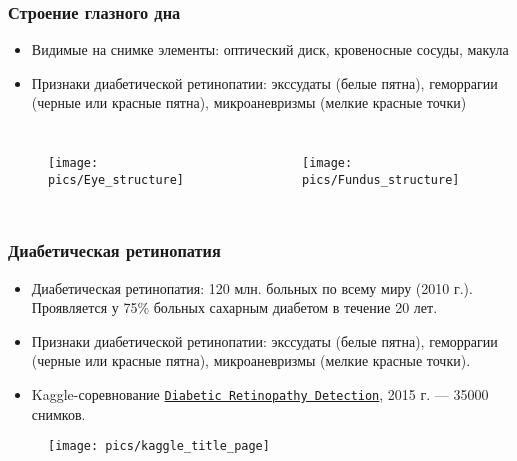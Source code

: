 \documentclass{beamer}
\begin{document}
\begin{frame}
	\frametitle{Строение глазного дна}
	
	\begin{itemize}
		\item Видимые на снимке элементы: оптический диск, кровеносные сосуды, макула
		\item Признаки диабетической ретинопатии: экссудаты (белые пятна), геморрагии (черные или красные пятна), микроаневризмы (мелкие красные точки)
	\end{itemize}
	
	\begin{columns}[c]
			\begin{figure}
				\centering
				\texttt{[image: pics/Eye\_structure]}
				\label{fig:Eye_structure}
			\end{figure}
		
			\begin{figure}
				\centering
				\texttt{[image: pics/Fundus\_structure]}
				\label{fig:Fundus_structure}
			\end{figure}
		
	\end{columns}
	
	
\end{frame}


\begin{frame}
	\frametitle{Диабетическая ретинопатия}
	
			\begin{itemize}
				\item Диабетическая ретинопатия: 120 млн. больных по всему миру (2010 г.). Проявляется у 75\% больных сахарным диабетом в течение 20 лет.
				\item Признаки диабетической ретинопатии: экссудаты (белые пятна), геморрагии (черные или красные пятна), микроаневризмы (мелкие красные точки).
				\item Kaggle-соревнование \href{https://www.kaggle.com/c/diabetic-retinopathy-detection/}{\texttt{Diabetic Retinopathy Detection}}, 2015 г. --- 35000 снимков.
			\end{itemize}
			\begin{figure}
				\centering
				\texttt{[image: pics/kaggle\_title\_page]}
				\label{fig:kaggle_title_page}
			\end{figure}
\end{frame}
\end{document}
